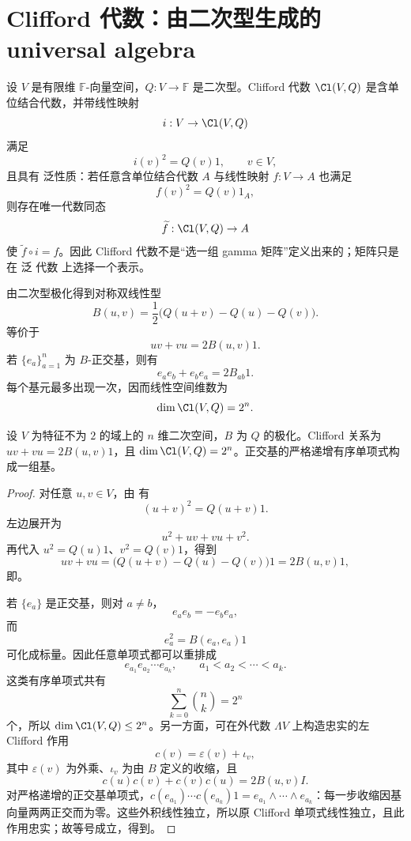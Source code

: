 \section{Clifford 代数：由二次型生成的 universal algebra}
\label{sec:clifford-universal}
设 $V$ 是有限维 $\mathbb F$-向量空间，$Q:V\to\mathbb F$ 是二次型。Clifford 代数 $\Cl(V,Q)$ 是含单位结合代数，并带线性映射
\[
i:V\to\Cl(V,Q)
\]
满足
\begin{equation}
i(v)^2=Q(v)1,
\qquad v\in V,
\label{eq:clifford-defining-relation}
\end{equation}
且具有 泛性质：若任意含单位结合代数 $A$ 与线性映射 $f:V\to A$ 也满足
\[
f(v)^2=Q(v)1_A,
\]
则存在唯一代数同态
\[
\widetilde f:\Cl(V,Q)\to A
\]
使 $\widetilde f\circ i=f$。因此 Clifford 代数不是“选一组 gamma 矩阵”定义出来的；矩阵只是在 泛 代数 上选择一个表示。

由二次型极化得到对称双线性型
\[
B(u,v)=\frac12\bigl(Q(u+v)-Q(u)-Q(v)\bigr).
\]
 等价于
\begin{equation}
uv+vu=2B(u,v)1.
\label{eq:clifford-anticommutator}
\end{equation}
若 $\{e_a\}_{a=1}^n$ 为 $B$-正交基，则有
\[
e_ae_b+e_be_a=2B_{ab}1.
\]
每个基元最多出现一次，因而线性空间维数为
\begin{equation}
\dim\Cl(V,Q)=2^n.
\label{eq:clifford-dimension}
\end{equation}

\begin{theorem}
设 $V$ 为特征不为 $2$ 的域上的 $n$ 维二次空间，$B$ 为 $Q$ 的极化。Clifford 关系为 $uv+vu=2B(u,v)1$，且 $\dim\Cl(V,Q)=2^n$。正交基的严格递增有序单项式构成一组基。
\end{theorem}
\begin{proof}
对任意 $u,v\in V$，由 有
\[
(u+v)^2=Q(u+v)1.
\]
左边展开为
\[
u^2+uv+vu+v^2.
\]
再代入 $u^2=Q(u)1$、$v^2=Q(v)1$，得到
\[
uv+vu
=\bigl(Q(u+v)-Q(u)-Q(v)\bigr)1
=2B(u,v)1,
\]
即。

若 $\{e_a\}$ 是正交基，则对 $a\neq b$，
\[
e_ae_b=-e_be_a,
\]
而
\[
e_a^2=B(e_a,e_a)1
\]
可化成标量。因此任意单项式都可以重排成
\[
e_{a_1}e_{a_2}\cdots e_{a_k},
\qquad
a_1<a_2<\cdots<a_k.
\]
这类有序单项式共有
\[
\sum_{k=0}^n\binom nk=2^n
\]
个，所以 $\dim\Cl(V,Q)\le2^n$。另一方面，可在外代数 $\Lambda V$ 上构造忠实的左 Clifford 作用
\[
c(v)=\varepsilon(v)+\iota_v,
\]
其中 $\varepsilon(v)$ 为外乘、$\iota_v$ 为由 $B$ 定义的收缩，且
\[
c(u)c(v)+c(v)c(u)=2B(u,v)I.
\]
对严格递增的正交基单项式，$c(e_{a_1})\cdots c(e_{a_k})1=e_{a_1}\wedge\cdots\wedge e_{a_k}$：每一步收缩因基向量两两正交而为零。这些外积线性独立，所以原 Clifford 单项式线性独立，且此作用忠实；故等号成立，得到。
\end{proof}


